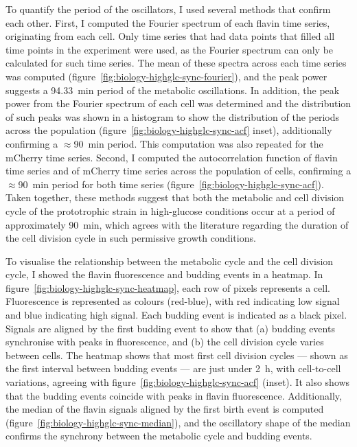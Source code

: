 To quantify the period of the oscillators, I used several methods that confirm each other.
First, I computed the Fourier spectrum of each flavin time series, originating from each cell.
Only time series that had data points that filled all time points in the experiment were used, as the Fourier spectrum can only be calculated for such time series.
The mean of these spectra across each time series was computed (figure~\ref{fig:biology-highglc-sync-fourier}), and the peak power suggests a \SI{94.33}{\minute} period of the metabolic oscillations.
In addition, the peak power from the Fourier spectrum of each cell was determined and the distribution of such peaks was shown in a histogram to show the distribution of the periods across the population (figure~\ref{fig:biology-highglc-sync-acf} inset), additionally confirming a $\approx$\SI{90}{\minute} period.
This computation was also repeated for the mCherry time series.
Second, I computed the autocorrelation function of flavin time series and of mCherry time series across the population of cells, confirming a $\approx$\SI{90}{\minute} period for both time series (figure~\ref{fig:biology-highglc-sync-acf}).
Taken together, these methods suggest that both the metabolic and cell division cycle of the prototrophic strain in high-glucose conditions occur at a period of approximately \SI{90}{\minute}, which agrees with the literature regarding the duration of the cell division cycle in such permissive growth conditions.

To visualise the relationship between the metabolic cycle and the cell division cycle, I showed the flavin fluorescence and budding events in a heatmap.
In figure~\ref{fig:biology-highglc-sync-heatmap},
each row of pixels represents a cell.
Fluorescence is represented as colours (red-blue), with red indicating low signal and blue indicating high signal.
Each budding event is indicated as a black pixel.
Signals are aligned by the first budding event to show that
(a) budding events synchronise with peaks in fluorescence, and
(b) the cell division cycle varies between cells.
The heatmap shows that most first cell division cycles --- shown as the first interval between budding events --- are just under \SI{2}{\hour}, with cell-to-cell variations, agreeing with figure~\ref{fig:biology-highglc-sync-acf} (inset).
It also shows that the budding events coincide with peaks in flavin fluorescence.
Additionally, the median of the flavin signals aligned by the first birth event is computed (figure~\ref{fig:biology-highglc-sync-median}), and the oscillatory shape of the median confirms the synchrony between the metabolic cycle and budding events.

